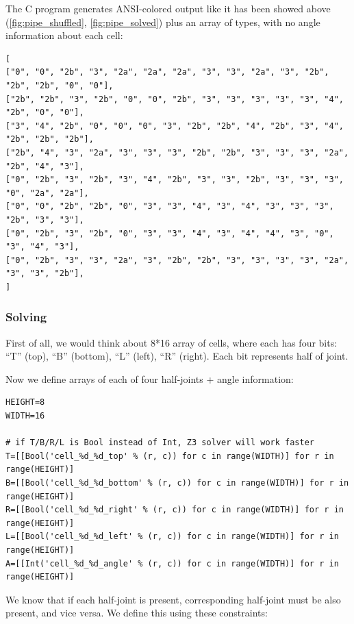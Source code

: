 The C program generates ANSI-colored output like it has been showed above (\ref{fig:pipe_shuffled}, \ref{fig:pipe_solved}) plus
an array of types, with no angle information about each cell:

\begin{lstlisting}[label=init_cells]
[
["0", "0", "2b", "3", "2a", "2a", "2a", "3", "3", "2a", "3", "2b", "2b", "2b", "0", "0"],
["2b", "2b", "3", "2b", "0", "0", "2b", "3", "3", "3", "3", "3", "4", "2b", "0", "0"],
["3", "4", "2b", "0", "0", "0", "3", "2b", "2b", "4", "2b", "3", "4", "2b", "2b", "2b"],
["2b", "4", "3", "2a", "3", "3", "3", "2b", "2b", "3", "3", "3", "2a", "2b", "4", "3"],
["0", "2b", "3", "2b", "3", "4", "2b", "3", "3", "2b", "3", "3", "3", "0", "2a", "2a"],
["0", "0", "2b", "2b", "0", "3", "3", "4", "3", "4", "3", "3", "3", "2b", "3", "3"],
["0", "2b", "3", "2b", "0", "3", "3", "4", "3", "4", "4", "3", "0", "3", "4", "3"],
["0", "2b", "3", "3", "2a", "3", "2b", "2b", "3", "3", "3", "3", "2a", "3", "3", "2b"],
]
\end{lstlisting}

\subsubsection{Solving}

First of all, we would think about 8*16 array of cells, where each has four bits:
``T'' (top),
``B'' (bottom),
``L'' (left),
``R'' (right).
Each bit represents half of joint.



Now we define arrays of each of four half-joints + angle information:

\begin{lstlisting}
HEIGHT=8
WIDTH=16

# if T/B/R/L is Bool instead of Int, Z3 solver will work faster
T=[[Bool('cell_%d_%d_top' % (r, c)) for c in range(WIDTH)] for r in range(HEIGHT)]
B=[[Bool('cell_%d_%d_bottom' % (r, c)) for c in range(WIDTH)] for r in range(HEIGHT)]
R=[[Bool('cell_%d_%d_right' % (r, c)) for c in range(WIDTH)] for r in range(HEIGHT)]
L=[[Bool('cell_%d_%d_left' % (r, c)) for c in range(WIDTH)] for r in range(HEIGHT)]
A=[[Int('cell_%d_%d_angle' % (r, c)) for c in range(WIDTH)] for r in range(HEIGHT)]
\end{lstlisting}

We know that if each half-joint is present, corresponding half-joint must be also present, and vice versa.
We define this using these constraints:

